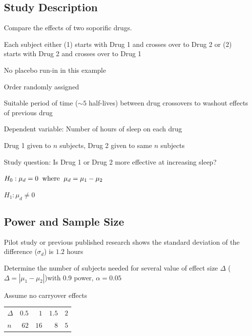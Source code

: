 \subsection{Study Description}

\bi
\item Compare the effects of two soporific drugs.
\item Each subject either (1) starts with Drug 1 and crosses over to Drug 2 or (2) starts with Drug 2 and crosses over to Drug 1
  \bi
    \item No placebo run-in in this example
    \item Order randomly assigned
    \item Suitable period of time ($\sim 5$ half-lives) between drug
      crossovers to washout effects of previous drug 
  \ei
\item Dependent variable: Number of hours of sleep on each drug
\item Drug 1 given to $n$ subjects, Drug 2 given to same $n$ subjects
\item Study question: Is Drug 1 or Drug 2 more effective at increasing sleep?
  \bi
  \item $H_0: \mu_d = 0 \hspace{.2cm} \textrm{where} \hspace{.2cm} \mu_d = \mu_1 - \mu_2$
  \item $H_1: \mu_d \neq 0$
  \ei
\ei


\subsection{Power and Sample Size}

\bi
\item Pilot study or previous published research shows the standard deviation of the difference ($\sigma_d$) is $1.2$ hours
\item Determine the number of subjects needed for several value of effect size $\Delta$ ($\Delta = |\mu_1 - \mu_2|$)with 0.9 power, $\alpha = 0.05$
\item Assume no carryover effects
\ei

\begin{table}[!hbp]
 \begin{center}
 \begin{tabular}{lrrrr}\hline\hline
$\Delta$ &$ 0.5$&$ 1$&$1.5$&$2$\\
$n$ &$62$&$16$&$8$&$5$\\
\hline
\end{tabular}
\end{center}
\end{table}

